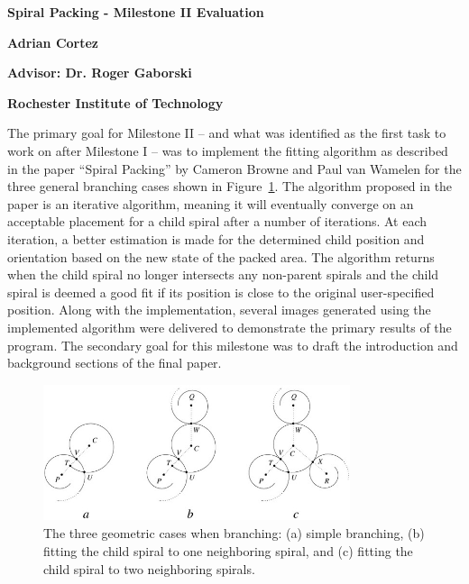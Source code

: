 \documentclass[12pt]{article}
\begin{document}
\begin{center}
	\Large
    	\textbf{Spiral Packing - Milestone II Evaluation}
    
    	\vspace{0.1cm}
    	\large
    	\textbf{Adrian Cortez}
	
	\vspace{0.1cm}	
	\small
    	\textbf{Advisor: Dr. Roger Gaborski}
        
    	\vspace{0.1cm}
    	\small
    	\textbf{Rochester Institute of Technology}
    	\vspace{0.3cm}
\end{center}

	The primary goal for Milestone II -- and what was identified as the first task to work on after Milestone I -- was to implement the fitting algorithm as described in the paper ``Spiral Packing'' by Cameron Browne and Paul van Wamelen \cite{Browne2006834} for the three general branching cases shown in Figure~\ref{fig:geo}. The algorithm proposed in the paper is an iterative algorithm, meaning it will eventually converge on an acceptable placement for a child spiral after a number of iterations. At each iteration, a better estimation is made for the determined child position and orientation based on the new state of the packed area. The algorithm returns when the child spiral no longer intersects any non-parent spirals and the child spiral is deemed a good fit if its position is close to the original user-specified position.\cite{Browne2006834} Along with the implementation, several images generated using the implemented algorithm were delivered to demonstrate the primary results of the program. The secondary goal for this milestone was to draft the introduction and background sections of the final paper.
	
\begin{figure}[ht]
	\centering
	\includegraphics[width=90mm,height=40mm]{spiral-packing-fig-01}
	\caption{The three geometric cases when branching: (a) simple branching, (b) fitting the child spiral to one neighboring spiral, and (c) fitting the child spiral to two neighboring spirals. \cite{Browne2006834}}
	\label{fig:geo}
\end{figure}
\end{document}
